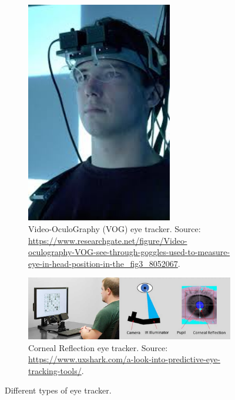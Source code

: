 \documentclass[12pt]{report}
\begin{document}
\begin{figure}[ht]
    \vspace{0.5em}
    
    \begin{subfigure}[b]{0.45\textwidth}
        \centering
        \includegraphics[width=0.7\textwidth,height=0.6\textwidth]{Images/Theory/vog.jpeg}
        \caption{Video-OculoGraphy (VOG) eye tracker. Source: \url{https://www.researchgate.net/figure/Video-oculography-VOG-see-through-goggles-used-to-measure-eye-in-head-position-in-the_fig3_8052067}.}
        \label{fig:vog}
    \end{subfigure}
    \hfill
    \begin{subfigure}[b]{0.45\textwidth}
        \centering
        \includegraphics[width=1\textwidth,height=0.6\textwidth]{Images/Theory/corneal.jpg}
        \caption{Corneal Reflection eye tracker. Source: \url{https://www.uxshark.com/a-look-into-predictive-eye-tracking-tools/}.}
        \label{fig:corneal}
    \end{subfigure}

    \caption{Different types of eye tracker.}
    \label{fig:four_grid}
\end{figure}
\end{document}
